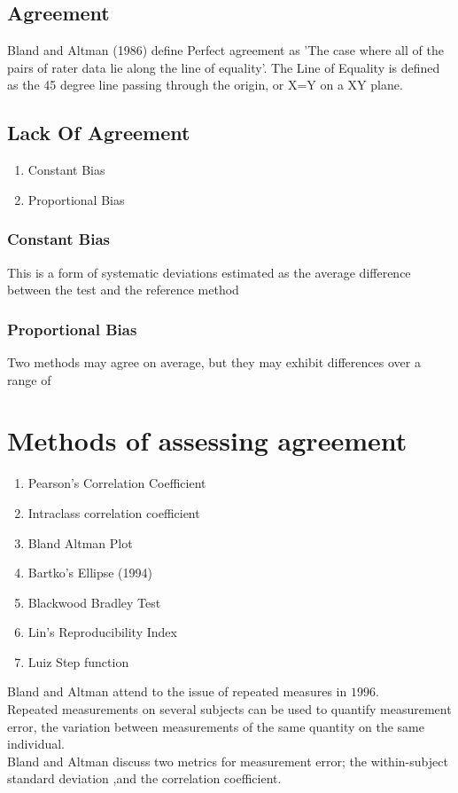 \documentclass[12pt, a4paper]{report}
\begin{document}
\subsection{Agreement} Bland and Altman (1986) define Perfect
agreement as 'The case where all of the pairs of rater data lie
along the line of equality'. The Line of Equality is defined as
the 45 degree line passing through the origin, or X=Y on a XY
plane.

\subsection{Lack Of Agreement}
\begin{enumerate}
	\item Constant Bias\item Proportional Bias
\end{enumerate}

\subsubsection*{Constant Bias} This is a form of systematic
deviations estimated as the average difference between the test
and the reference method


\subsubsection*{Proportional Bias} Two methods may agree on
average, but they may exhibit differences over a range of
	\section{Methods of assessing agreement}
	
	\begin{enumerate}
		\item Pearson's Correlation Coefficient\item Intraclass
		correlation coefficient \item Bland Altman Plot \item Bartko's
		Ellipse (1994) \item Blackwood Bradley Test \item Lin's
		Reproducibility Index \item Luiz Step function
	\end{enumerate}
	
	Bland and Altman attend to the issue of repeated measures in
	$1996$.
	\\
	Repeated measurements on several subjects can be used to quantify
	measurement error, the variation between measurements of the same
	quantity on the same individual.
	\\
	Bland and Altman discuss two metrics for measurement error; the
	within-subject standard deviation ,and the correlation
	coefficient.
	
\end{document}

